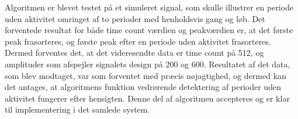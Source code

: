 Algoritmen er blevet testet på et simuleret signal, som skulle illustrer en periode uden aktivitet omringet af to perioder med henholdsvis gang og løb. Det forventede resultat for både time count værdien og peakværdien er, at det første peak frasorteres, og første peak efter en periode uden aktivitet frasorteres. Dermed forventes det, at det videresendte data er time count på 512, og amplituder som afspejler signalets design på 200 og 600. Resultatet af det data, som blev modtaget, var som forventet med præcis nøjagtighed, og dermed kan det antages, at algoritmens funktion vedrørende detektering af perioder uden aktivitet fungerer efter hensigten. Denne del af algoritmen accepteres og er klar til implementering i det samlede system.